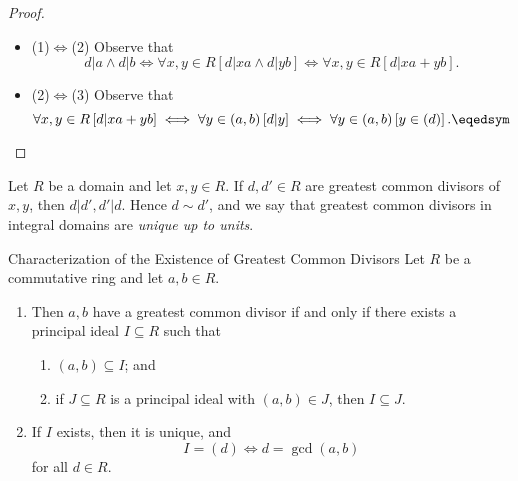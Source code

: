 \documentclass[pmath347]{subfiles}
\begin{document}
    \begin{proof}
        \begin{itemize}
            \item (1)$\iff$(2) Observe that
                    \begin{equation*}
                        d|a\land d|b\iff \forall x,y\in R\left[ d|xa\land d|yb \right] \iff \forall x,y\in R\left[ d|xa+yb \right] .
                    \end{equation*}
            \item (2)$\iff$(3) Observe that
                    \begin{equation*}
                        \forall x,y\in R\left[ d|xa+yb \right] \iff \forall y\in\left( a,b \right) \left[ d|y \right] \iff \forall y\in\left( a,b \right) \left[ y\in\left( d \right)  \right] . \eqedsym
                    \end{equation*}
        \end{itemize} 
    \end{proof}

    \np Let $R$ be a domain and let $x,y\in R$. If $d,d'\in R$ are greatest common divisors of $x,y$, then $d|d', d'|d$. Hence $d\sim d'$, and we say that greatest common divisors in integral domains are \textit{unique up to units}.

    \begin{prop}{Characterization of the Existence of Greatest Common Divisors}
        Let $R$ be a commutative ring and let $a,b\in R$. 
        \begin{enumerate}
            \item Then $a,b$ have a greatest common divisor if and only if there exists a principal ideal $I\subseteq R$ such that
                \begin{enumerate}
                    \item $\left( a,b \right) \subseteq I$; and
                    \item if $J\subseteq R$ is a principal ideal with $\left( a,b \right) \in J$, then $I\subseteq J$.
                \end{enumerate}
            \item If $I$ exists, then it is unique, and
                \begin{equation*}
                    I = \left( d \right) \iff d=\gcd\left( a,b \right) 
                \end{equation*}
                for all $d\in R$.
        \end{enumerate}
    \end{prop}
\end{document}
